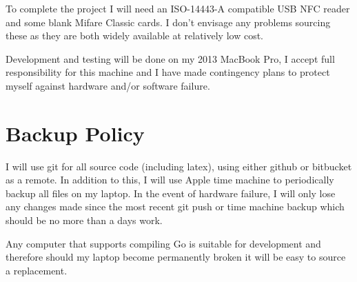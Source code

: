 \documentclass[a4paper, 12pt]{article}
\begin{document}
  To complete the project I will need an ISO-14443-A compatible USB NFC reader
  and some blank Mifare Classic cards. I don't envisage any problems sourcing
  these as they are both widely available at relatively low cost.

  Development and testing will be done on my 2013 MacBook Pro, I accept full
  responsibility for this machine and I have made contingency plans to protect
  myself against hardware and/or software failure.

  \section*{Backup Policy}

  I will use git for all source code (including latex), using either github or
  bitbucket as a remote. In addition to this, I will use Apple time machine to
  periodically backup all files on my laptop. In the event of hardware failure,
  I will only lose any changes made since the most recent git push or time
  machine backup which should be no more than a days work.

  Any computer that supports compiling Go is suitable for development and
  therefore should my laptop become permanently broken it will be easy to source
  a replacement.

  
  
\end{document}
